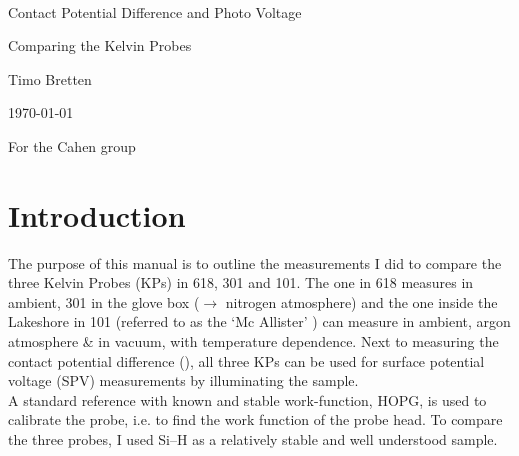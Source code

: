 \documentclass[a4paper,10pt]{article}
\newcommand{\mktit}{
	\thispagestyle{empty}
	\begin{center}
	\hrulefill \\
	\begin{huge}Contact Potential Difference and Photo Voltage \\ \end{huge} 
	\begin{Large} Comparing the Kelvin Probes \\ \end{Large} \vspace*{0.8cm}

	\begin{large}Timo Bretten  \\\end{large} \vspace*{1.2cm}	
	
	\today \\ \vspace*{0.8cm}
	\begin{LARGE}For the Cahen group\\\end{LARGE}
	
	\end{center}
	\newpage
	\setcounter{page}{2}
}
\newcommand{\sih}{Si--H}
\newcommand{\cpd}{\text{CPD}}
\newcommand{\McA}{Mc Allister}
\newcommand{\hopg}{HOPG}
\newcommand{\kp}{KP}
\newcommand{\spv}{SPV}
\newcommand{\ie}{i.e.}
\begin{document}
\mktit

\section{Introduction}
The purpose of this manual is to outline the measurements I did to compare the three Kelvin Probes (\kp{}s) in 618, 301 and 101. The one in 618 measures in ambient, 301 in the glove box ($\rightarrow$ nitrogen atmosphere) and the one inside the Lakeshore in 101 (referred to as the \lq{}\McA{}\rq{} ) can measure in ambient, argon atmosphere \& in vacuum, with temperature dependence. Next to measuring the contact potential difference (\cpd{}), all three \kp{}s can be used for surface potential voltage (\spv{}) measurements by illuminating the sample.\\
A standard reference with known and stable work-function, \hopg{}, is used to calibrate the probe, \ie{} to find the work function of the probe head. To compare the three probes, I used \sih{} as a relatively stable and well understood sample.
\end{document}
